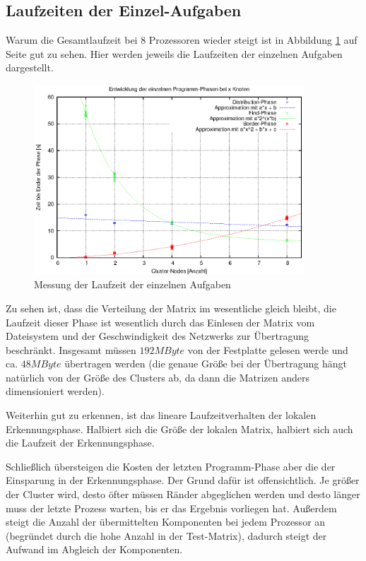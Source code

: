 \subsection{Laufzeiten der Einzel-Aufgaben} \label{bench:task}

Warum die Gesamtlaufzeit bei 8 Prozessoren wieder steigt ist in Abbildung \ref{fig:bench_tasks} auf Seite \pageref{fig:bench_tasks} gut zu sehen. Hier werden jeweils die Laufzeiten der einzelnen Aufgaben dargestellt.

\begin{figure}[tbhp]
	\centering
	\includegraphics[width=0.9\textwidth]{images/phases.eps}
	\caption{Messung der Laufzeit der einzelnen Aufgaben}
	\label{fig:bench_tasks}
\end{figure}

Zu sehen ist, dass die Verteilung der Matrix im wesentliche gleich bleibt, die Laufzeit dieser Phase ist wesentlich durch das Einlesen der Matrix vom Dateisystem und der Geschwindigkeit des Netzwerks zur Übertragung beschränkt. Insgesamt müssen $192MByte$ von der Festplatte gelesen werde und ca. $48MByte$ übertragen werden (die genaue Größe bei der Übertragung hängt natürlich von der Größe des Clusters ab, da dann die Matrizen anders dimensioniert werden).

Weiterhin gut zu erkennen, ist das lineare Laufzeitverhalten der lokalen Erkennungsphase. Halbiert sich die Größe der lokalen Matrix, halbiert sich auch die Laufzeit der Erkennungsphase.

Schließlich übersteigen die Kosten der letzten Programm-Phase aber die der Einsparung in der Erkennungsphase. Der Grund dafür ist offensichtlich. Je größer der Cluster wird, desto öfter müssen Ränder abgeglichen werden und desto länger muss der letzte Prozess warten, bis er das Ergebnis vorliegen hat. Außerdem steigt die Anzahl der übermittelten Komponenten bei jedem Prozessor an (begründet durch die hohe Anzahl in der Test-Matrix), dadurch steigt der Aufwand im Abgleich der Komponenten.